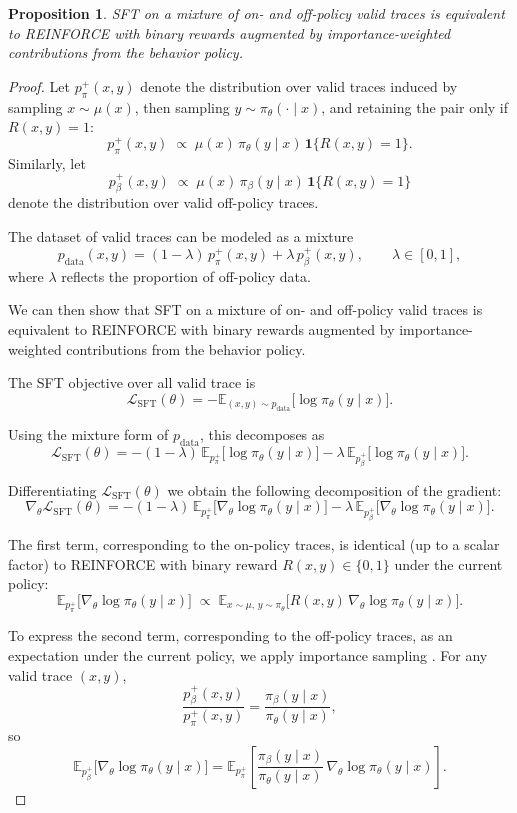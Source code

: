 \documentclass{article}
\newtheorem{proposition}{Proposition}
\renewcommand{\cite}[1]{\citep[][]{#1}}
\begin{document}
\begin{proposition}
SFT on a mixture of on- and off-policy valid traces is equivalent to REINFORCE
with binary rewards augmented by importance-weighted contributions from the
behavior policy.
\end{proposition}
\begin{proof}
Let $p_\pi^+(x,y)$ denote the distribution over valid traces induced by
sampling $x \sim \mu(x)$, then sampling $y \sim \pi_\theta(\cdot \mid x)$, and
retaining the pair only if $R(x,y)=1$:
\[
p_\pi^+(x,y)
\;\propto\;
\mu(x)\,\pi_\theta(y\mid x)\,\mathbf{1}\{R(x,y)=1\}.
\]
Similarly, let
\[
p_\beta^+(x,y)
\;\propto\;
\mu(x)\,\pi_\beta(y\mid x)\,\mathbf{1}\{R(x,y)=1\}
\]
denote the distribution over valid off-policy traces.

The dataset of valid traces can be modeled as a mixture
\[
p_{\mathrm{data}}(x,y)
=
(1-\lambda)\,p_\pi^+(x,y)
+ \lambda\,p_\beta^+(x,y),
\qquad \lambda \in [0,1],
\]
where $\lambda$ reflects the proportion of off-policy data.

We can then show that SFT on a mixture of on- and off-policy valid traces
is equivalent to REINFORCE with binary rewards augmented by importance-weighted
contributions from the behavior policy.

The SFT objective over all valid trace is
\[
\mathcal{L}_{\mathrm{SFT}}(\theta)
=
-\mathbb{E}_{(x,y)\sim p_{\mathrm{data}}}
\big[\log \pi_\theta(y\mid x)\big].
\]

Using the mixture form of $p_{\mathrm{data}}$, this decomposes as
\[
\mathcal{L}_{\mathrm{SFT}}(\theta)
=
-(1-\lambda)\,\mathbb{E}_{p_\pi^+}
\big[\log \pi_\theta(y\mid x)\big]
-
\lambda\,\mathbb{E}_{p_\beta^+}
\big[\log \pi_\theta(y\mid x)\big].
\]

Differentiating $\mathcal{L}_{\mathrm{SFT}}(\theta)$ we obtain the following decomposition of the gradient:
\[
\nabla_\theta \mathcal{L}_{\mathrm{SFT}}(\theta)
=
-(1-\lambda)\,\mathbb{E}_{p_\pi^+}
\big[\nabla_\theta \log \pi_\theta(y\mid x)\big]
-
\lambda\,\mathbb{E}_{p_\beta^+}
\big[\nabla_\theta \log \pi_\theta(y\mid x)\big].
\]

The first term, corresponding to the on-policy traces, is identical (up to a
scalar factor) to REINFORCE with binary reward $R(x,y)\in\{0,1\}$ under the
current policy:
\[
\mathbb{E}_{p_\pi^+}
\big[\nabla_\theta \log \pi_\theta(y\mid x)\big]
\;\propto\;
\mathbb{E}_{x\sim \mu,\, y\sim \pi_\theta}
\big[R(x,y)\,\nabla_\theta \log \pi_\theta(y\mid x)\big].
\]

To express the second term, corresponding to the off-policy traces, as an
expectation under the current policy, we apply importance sampling
\cite{precup-et-al-icml2000}. For any valid trace $(x,y)$,
\[
\frac{p_\beta^+(x,y)}{p_\pi^+(x,y)}
=
\frac{\pi_\beta(y\mid x)}{\pi_\theta(y\mid x)},
\]
so
\[
\mathbb{E}_{p_\beta^+}
\big[\nabla_\theta \log \pi_\theta(y\mid x)\big]
=
\mathbb{E}_{p_\pi^+}
\left[
\frac{\pi_\beta(y\mid x)}{\pi_\theta(y\mid x)}\,
\nabla_\theta \log \pi_\theta(y\mid x)
\right].
\]


\end{proof}
\end{document}
